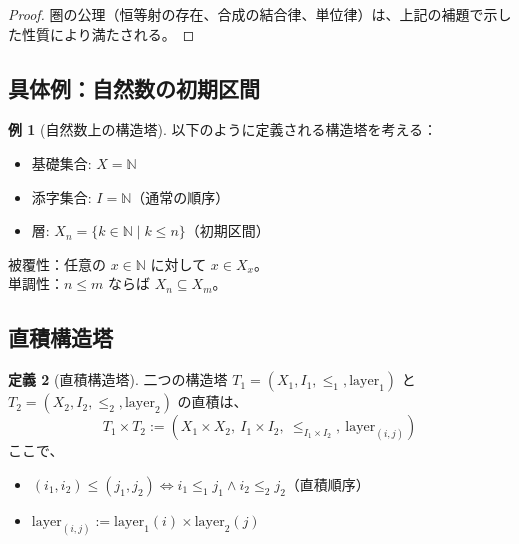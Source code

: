 \documentclass[a4paper,12pt]{ltjsarticle}
\theoremstyle{definition}
\newtheorem{definition}{定義}[section]
\newtheorem{example}[definition]{例}
\begin{document}
\begin{proof}
圏の公理（恒等射の存在、合成の結合律、単位律）は、上記の補題で示した性質により満たされる。
\end{proof}

\subsection{具体例：自然数の初期区間}

\begin{example}[自然数上の構造塔]
\label{ex:nat-tower}
以下のように定義される構造塔を考える：
\begin{itemize}
\item 基礎集合: $X = \mathbb{N}$
\item 添字集合: $I = \mathbb{N}$（通常の順序）
\item 層: $X_n = \{k \in \mathbb{N} \mid k \leq n\}$（初期区間）
\end{itemize}

被覆性：任意の $x \in \mathbb{N}$ に対して $x \in X_x$。\\
単調性：$n \leq m$ ならば $X_n \subseteq X_m$。
\end{example}

\subsection{直積構造塔}

\begin{definition}[直積構造塔]
\label{def:product-tower}
二つの構造塔 $T_1 = (X_1, I_1, \leq_1, \mathrm{layer}_1)$ と $T_2 = (X_2, I_2, \leq_2, \mathrm{layer}_2)$ の直積は、
\[
T_1 \times T_2 := (X_1 \times X_2,\ I_1 \times I_2,\ \leq_{I_1 \times I_2},\ \mathrm{layer}_{(i,j)})
\]
ここで、
\begin{itemize}
\item $(i_1, i_2) \leq (j_1, j_2) \Leftrightarrow i_1 \leq_1 j_1 \land i_2 \leq_2 j_2$（直積順序）
\item $\mathrm{layer}_{(i,j)} := \mathrm{layer}_1(i) \times \mathrm{layer}_2(j)$
\end{itemize}
\end{definition}
\end{document}
